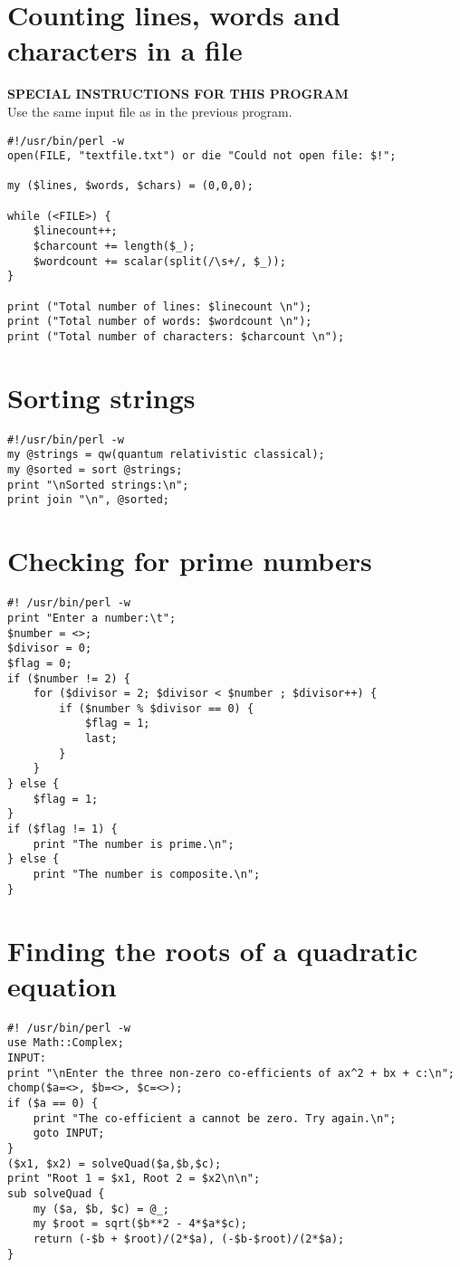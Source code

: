 \documentclass[11pt,oneside]{article}
\newcommand{\info}[1]{\textbf{\scriptsize{\sffamily\addfontfeatures{LetterSpace=7} #1\\[.35em]}}}
\begin{document}
\section{Counting lines, words and characters in a file}
\begin{infobox}
\info{\MakeUppercase{Special instructions for this program}}
Use the same input file as in the previous program.
\end{infobox}
\begin{lstlisting}
#!/usr/bin/perl -w
open(FILE, "textfile.txt") or die "Could not open file: $!";

my ($lines, $words, $chars) = (0,0,0);

while (<FILE>) {
    $linecount++;
    $charcount += length($_);
    $wordcount += scalar(split(/\s+/, $_));
}

print ("Total number of lines: $linecount \n");
print ("Total number of words: $wordcount \n");
print ("Total number of characters: $charcount \n");
\end{lstlisting}
%
%
\section{Sorting strings}
\begin{lstlisting}
#!/usr/bin/perl -w
my @strings = qw(quantum relativistic classical);
my @sorted = sort @strings;
print "\nSorted strings:\n";
print join "\n", @sorted;
\end{lstlisting}
%
%
\vspace{0.5cm}
\section{Checking for prime numbers}
\begin{lstlisting}
#! /usr/bin/perl -w
print "Enter a number:\t";
$number = <>;
$divisor = 0;
$flag = 0;
if ($number != 2) {
	for ($divisor = 2; $divisor < $number ; $divisor++) {
		if ($number % $divisor == 0) {
			$flag = 1;
			last;
		}
	}
} else {
	$flag = 1;
}
if ($flag != 1) {
	print "The number is prime.\n";
} else {
	print "The number is composite.\n";
}
\end{lstlisting}
%
%
\vspace{0.5cm}
\section{Finding the roots of a quadratic equation}
\begin{lstlisting}
#! /usr/bin/perl -w
use Math::Complex;
INPUT:
print "\nEnter the three non-zero co-efficients of ax^2 + bx + c:\n";
chomp($a=<>, $b=<>, $c=<>);
if ($a == 0) {
	print "The co-efficient a cannot be zero. Try again.\n";
	goto INPUT;
}
($x1, $x2) = solveQuad($a,$b,$c);
print "Root 1 = $x1, Root 2 = $x2\n\n";
sub solveQuad {
	my ($a, $b, $c) = @_;
	my $root = sqrt($b**2 - 4*$a*$c);
	return (-$b + $root)/(2*$a), (-$b-$root)/(2*$a);
}
\end{lstlisting}
\pagebreak
%
%
\end{document}
